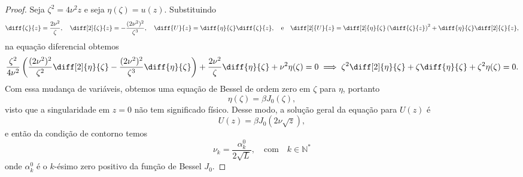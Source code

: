\begin{proof}
    Seja \(\zeta^2 = 4\nu^2 z\) e seja \(\eta(\zeta) = u(z)\). Substituindo
    \begin{equation*}
        \diff{\zeta}{z} = \frac{2\nu^2}{\zeta},\quad  \diff[2]{\zeta}{z} = -\frac{(2\nu^2)^2}{\zeta^3},\quad \diff{U}{z} = \diff{\eta}{\zeta} \diff{\zeta}{z},\quad\text{e}\quad\diff[2]{U}{z} = \diff[2]{\eta}{\zeta}\left(\diff{\zeta}{z}\right)^2 + \diff{\eta}{\zeta}\diff[2]{\zeta}{z},
    \end{equation*}
    na equação diferencial obtemos
    \begin{equation*}
        \frac{\zeta^2}{4\nu^2}\left(\frac{(2\nu^2)^2}{\zeta^2}\diff[2]{\eta}{\zeta} - \frac{(2\nu^2)^2}{\zeta^3}\diff{\eta}{\zeta}\right) + \frac{2\nu^2}{\zeta}\diff{\eta}{\zeta} + \nu^2 \eta(\zeta) = 0 \implies
        \zeta^2 \diff[2]{\eta}{\zeta} + \zeta\diff{\eta}{\zeta}  + \zeta^2 \eta(\zeta) = 0.
    \end{equation*}
    Com essa mudança de variáveis, obtemos uma equação de Bessel de ordem zero em \(\zeta\) para \(\eta\), portanto
    \begin{equation*}
        \eta(\zeta) = \beta J_0(\zeta),
    \end{equation*}
    visto que a singularidade em \(z = 0\) não tem significado físico. Desse modo, a solução geral da equação para \(U(z)\) é
    \begin{equation*}
        U(z) = \beta J_0(2\nu \sqrt{z}),
    \end{equation*}
    e então da condição de contorno temos
    \begin{equation*}
        \nu_k = \frac{\alpha_k^0}{2\sqrt{L}},\quad\text{com}\quad k \in \mathbb{N}^{\ast}
    \end{equation*}
    onde \(\alpha_k^0\) é o \(k\)-ésimo zero positivo da função de Bessel \(J_0\).


\end{proof}
